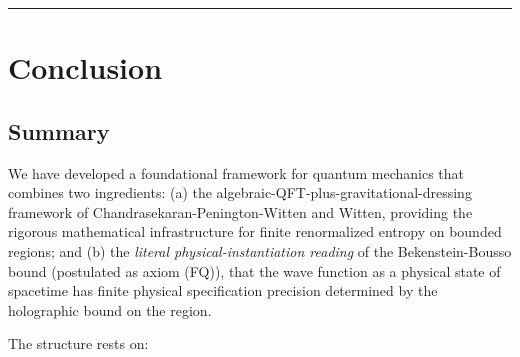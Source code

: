 \documentclass[11pt,a4paper]{article}
\begin{document}
\medskip\hrule\medskip

\section{Conclusion}

\subsection{Summary}

We have developed a foundational framework for quantum mechanics that combines two ingredients: (a) the algebraic-QFT-plus-gravitational-dressing framework of Chandrasekaran-Penington-Witten and Witten, providing the rigorous mathematical infrastructure for finite renormalized entropy on bounded regions; and (b) the \emph{literal physical-instantiation reading} of the Bekenstein-Bousso bound (postulated as axiom (FQ)), that the wave function as a physical state of spacetime has finite physical specification precision determined by the holographic bound on the region.

The structure rests on:
\end{document}
